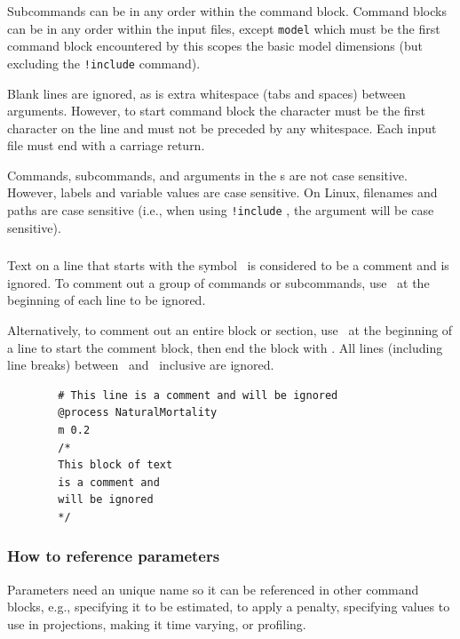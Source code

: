 Subcommands can be in any order within the command block. Command blocks can be in any order within the input files, except \texttt{\command{}model} which must be the first command block encountered by \CNAME\since this scopes the basic model dimensions (but excluding the \texttt{!include} command).
	
Blank lines are ignored, as is extra whitespace (tabs and spaces) between arguments. However, to start command block the \command{} character must be the first character on the line and must not be preceded by any whitespace. Each input file must end with a carriage return.

Commands, subcommands, and arguments in the \config s are not case sensitive. However, labels and variable values are case sensitive. On Linux, filenames and paths are case sensitive (i.e., when using \texttt{!include} , the argument  will be case sensitive).


\subsubsection{}

Text on a line that starts with the symbol \commentline\ is considered to be a comment and is ignored. To comment out a group of commands or subcommands, use \commentline\ at the beginning of each line to be ignored.

Alternatively, to comment out an entire block or section, use \commentstart\ at the beginning of a line to start the comment block, then end the block with \commentend. All lines (including line breaks) between \commentstart\ and \commentend\ inclusive are ignored.

{\small{\begin{verbatim}
		# This line is a comment and will be ignored
		@process NaturalMortality
		m 0.2
		/*
		This block of text
		is a comment and
		will be ignored
		*/
\end{verbatim}}}

\subsubsection{How to reference parameters\label{sec:parameter-names}}

Parameters need an unique name so it can be referenced in other command blocks, e.g., specifying it to be estimated, to apply a penalty, specifying values to use in projections, making it time varying, or profiling. 


